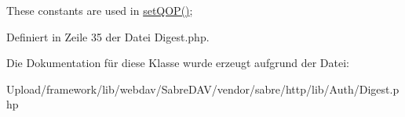 These constants are used in \mbox{\hyperlink{class_sabre_1_1_h_t_t_p_1_1_auth_1_1_digest_a11ee647072118c6062f8f8b59e61f981}{set\+Q\+O\+P()}}; 

Definiert in Zeile 35 der Datei Digest.\+php.



Die Dokumentation für diese Klasse wurde erzeugt aufgrund der Datei\+:\begin{DoxyCompactItemize}
\item 
Upload/framework/lib/webdav/\+Sabre\+D\+A\+V/vendor/sabre/http/lib/\+Auth/Digest.\+php\end{DoxyCompactItemize}
